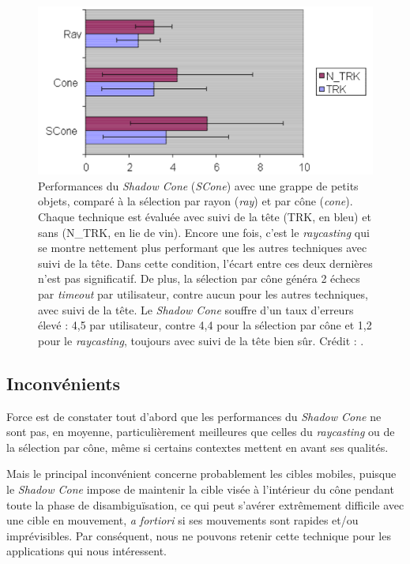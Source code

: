 	\begin{figure}[H]
		\centering
		\includegraphics[width=\textwidth]{figures/ch2/shadowCSmall}
		\caption[Performances du \emph{Shadow Cone} --- Grappe de petits objets]{Performances du \emph{Shadow Cone} (\emph{SCone}) avec une grappe de petits objets, comparé à la sélection par rayon (\emph{ray}) et par cône (\emph{cone}). Chaque technique est évaluée avec suivi de la tête (TRK, en bleu) et sans (N\_{}TRK, en lie de vin). Encore une fois, c'est le \emph{raycasting} qui se montre nettement plus performant que les autres techniques avec suivi de la tête. Dans cette condition, l'écart entre ces deux dernières n'est pas significatif. De plus, la sélection par cône généra 2 échecs par \emph{timeout} par utilisateur, contre aucun pour les autres techniques, avec suivi de la tête. Le \emph{Shadow Cone} souffre d'un taux d'erreurs élevé : 4,5 par utilisateur, contre 4,4 pour la sélection par cône et 1,2 pour le \emph{raycasting}, toujours avec suivi de la tête bien sûr. Crédit : \cite{steed20043d}.}
		\label{fig:shadowCSmall}
	\end{figure}
	
	\subsection{Inconvénients}
	Force est de constater tout d'abord que les performances du \emph{Shadow Cone} ne sont pas, en moyenne, particulièrement meilleures que celles du \emph{raycasting} ou de la sélection par cône, même si certains contextes mettent en avant ses qualités.
	
	Mais le principal inconvénient concerne probablement les cibles mobiles, puisque le \emph{Shadow Cone} impose de maintenir la cible visée à l'intérieur du cône pendant toute la phase de disambiguïsation, ce qui peut s'avérer extrêmement difficile avec une cible en mouvement, \emph{a fortiori} si ses mouvements sont rapides et/ou imprévisibles. Par conséquent, nous ne pouvons retenir cette technique pour les applications qui nous intéressent.
	
